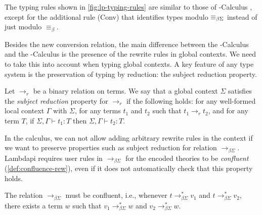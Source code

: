 \begin{remark}
The typing rules shown in \cref{fig:lp-typing-rules} are similar to those of  \lp{}-Calculus \cite[\S 2]{lf}, except for the additional rule (Conv) that identifies types modulo $\equiv_{\beta\Sigma}$ instead of just modulo $\equiv_\beta$.
\end{remark}

Besides the new conversion relation, the main difference between the \lp-Calculus and the \lpm-Calculus is the presence of the rewrite rules
in global contexts. We need to take this into account when typing global contexts. A key feature of any type system is the preservation of typing by reduction: the
subject reduction property.

\begin{definition}
Let $\longrightarrow_r$ be a binary relation on terms.
We say that a global context $\Sigma$ satisfies the \emph{subject reduction} property for $\longrightarrow_r$ if the following holds:
for any well-formed local context $\Gamma$ with $\Sigma$, for any terms $t_1$ and $t_2$ such that $t_1 \longrightarrow_r t_2$, and for any term $T$,
if $\Sigma, \Gamma \vdash t_1 : T$ then $\Sigma, \Gamma \vdash t_2 : T$.
\end{definition}

In the \lpm calculus, we can not allow adding arbitrary rewrite rules in the context if
we want to preserve properties such as subject reduction for relation $\longrightarrow_{\beta\Sigma}$.
Lambdapi requires user rules in $\longrightarrow_{\beta\Sigma}$ for the encoded theories to be \emph{confluent} (\cref{def:confluence-rew}),
even if it does not automatically check that this property holds.

\begin{definition}\label{def:confluence-rew}
The relation $\longrightarrow_{\beta\Sigma}$ must be confluent, i.e., whenever $t \longrightarrow_{\beta\Sigma}^* v_1$ and $t \longrightarrow_{\beta\Sigma}^* v_2$, there exists a term $w$ such that $v_1 \longrightarrow_{\beta\Sigma}^* w$ and $v_2 \longrightarrow_{\beta\Sigma}^* w$.

\begin{center}
\end{center}
\end{definition}

